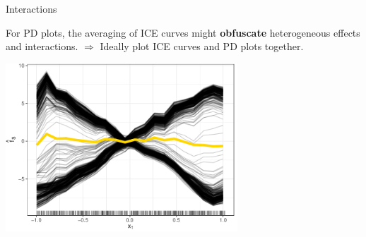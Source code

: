 \documentclass[11pt,compress,t,notes=noshow, xcolor=table]{beamer}
\begin{document}
\begin{vbframe}{Interactions}

For PD plots, the averaging of ICE curves might \textbf{obfuscate} heterogeneous effects and interactions. \newline \(\Rightarrow\) Ideally plot ICE curves and PD plots together.

\begin{center}\includegraphics[width=0.65\textwidth]{figure_man/pdp_xor.pdf} \end{center}
%
%
%
\end{vbframe}

\end{document}
